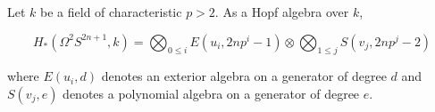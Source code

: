 Let $k$ be a field of characteristic $p > 2$. As a Hopf algebra over $k$,

$$H_*(\Omega^2 S^{2n+1}, k) = \bigotimes_{0 \leq i} E(u_i, 2np^i - 1) \otimes \bigotimes_{1 \leq j} S(v_j, 2np^j - 2)$$

where $E(u_i, d)$ denotes an exterior algebra on a generator of degree $d$ and $S(v_j, e)$ denotes a polynomial algebra on a generator of degree $e$.
